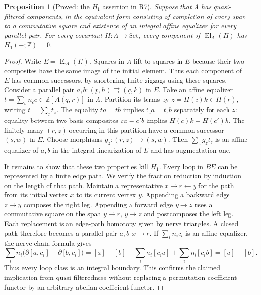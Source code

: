 \documentclass[11pt,a4paper]{article}
\newtheorem{proposition}[theorem]{Proposition}
\theoremstyle{definition}
\begin{document}
\begin{proposition}[Proved: the $H_1$ assertion in R7]\label{B:H1}
Suppose that $A$ has quasi-filtered components, in the equivalent
form consisting of completion of every span to a commutative square
and existence of an integral affine equalizer for every parallel pair.
For every covariant $H:A\to\mathrm{Set}$, every component of
$\operatorname{El}_A(H)$ has $H_1(-;\mathbb Z)=0$.
\end{proposition}
\begin{proof}
Write $E=\operatorname{El}_A(H)$.  Squares in $A$ lift to squares in
$E$ because their two composites have the same image of the initial
element.  Thus each component of $E$ has common successors, by shortening
finite zigzags using these squares.  Consider a parallel pair
$a,b:(p,h)\rightrightarrows(q,k)$ in $E$.  Take an affine equalizer
$t=\sum_c n_c c\in\mathbb Z[A(q,r)]$ in $A$.  Partition its terms by
$z=H(c)k\in H(r)$, writing $t=\sum_z t_z$.  The equality $ta=tb$
implies $t_za=t_zb$ separately for each $z$: equality between two basis
composites $ca=c'b$ implies $H(c)k=H(c')k$.  The finitely many
$(r,z)$ occurring in this partition have a common successor $(s,w)$
in $E$.  Choose morphisms $g_z:(r,z)\to(s,w)$.  Then
$\sum_zg_zt_z$ is an affine equalizer of $a,b$ in the integral
linearization of $E$ and has augmentation one.

It remains to show that these two properties kill $H_1$.  Every loop
in $BE$ can be represented by a finite edge path.  We verify the fraction reduction by induction on the length of that path. Maintain a representative $x\to r\leftarrow y$ for the path from its initial vertex $x$ to its current vertex $y$. Appending a backward edge $z\to y$ composes the right leg. Appending a forward edge $y\to z$ uses a commutative square on the span $y\to r$, $y\to z$ and postcomposes the left leg. Each replacement is an edge-path homotopy given by nerve triangles. A closed path therefore becomes a parallel pair $a,b:x\to r$.  If
$\sum_i n_i c_i$ is an affine equalizer, the nerve chain formula gives
\[
 \sum_i n_i\bigl(\partial[a,c_i]-\partial[b,c_i]\bigr)
 = [a]-[b]-\sum_i n_i[c_i a]+\sum_i n_i[c_i b]=[a]-[b].
\]
Thus every loop class is an integral boundary.  This confirms the
claimed implication from quasi-filteredness without replacing a
permutation coefficient functor by an arbitrary abelian coefficient
functor.
\end{proof}
\end{document}
